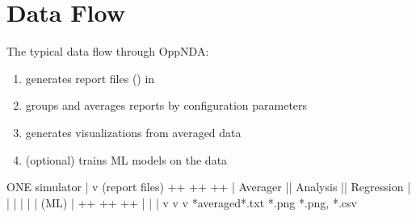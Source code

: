 \documentclass[a4paper,11pt,english,openany,oneside]{sphinxmanual}
\begin{document}
\section{Data Flow}
\label{\detokenize{developer_guide:data-flow}}
\sphinxAtStartPar
The typical data flow through OppNDA:
\begin{enumerate}
%
\item {} 
\sphinxAtStartPar
{} generates report files () in 

\item {} 
\sphinxAtStartPar
{} groups and averages reports by configuration parameters

\item {} 
\sphinxAtStartPar
{} generates visualizations from averaged data

\item {} 
\sphinxAtStartPar
{} (optional) trains ML models on the data

\end{enumerate}

\begin{sphinxVerbatim}[commandchars=\\\{\}]
ONE simulator
     |
     v (report files)
+\PYGZhy{}\PYGZhy{}\PYGZhy{}\PYGZhy{}\PYGZhy{}\PYGZhy{}\PYGZhy{}\PYGZhy{}\PYGZhy{}\PYGZhy{}\PYGZhy{}\PYGZhy{}\PYGZhy{}+     +\PYGZhy{}\PYGZhy{}\PYGZhy{}\PYGZhy{}\PYGZhy{}\PYGZhy{}\PYGZhy{}\PYGZhy{}\PYGZhy{}\PYGZhy{}\PYGZhy{}\PYGZhy{}\PYGZhy{}+     +\PYGZhy{}\PYGZhy{}\PYGZhy{}\PYGZhy{}\PYGZhy{}\PYGZhy{}\PYGZhy{}\PYGZhy{}\PYGZhy{}\PYGZhy{}\PYGZhy{}\PYGZhy{}\PYGZhy{}+
|  Averager   |\PYGZhy{}\PYGZhy{}\PYGZhy{}\PYGZhy{}\PYGZgt{}|  Analysis   |\PYGZhy{}\PYGZhy{}\PYGZhy{}\PYGZhy{}\PYGZgt{}|  Regression |
|             |     |             |     |   (ML)      |
+\PYGZhy{}\PYGZhy{}\PYGZhy{}\PYGZhy{}\PYGZhy{}\PYGZhy{}\PYGZhy{}\PYGZhy{}\PYGZhy{}\PYGZhy{}\PYGZhy{}\PYGZhy{}\PYGZhy{}+     +\PYGZhy{}\PYGZhy{}\PYGZhy{}\PYGZhy{}\PYGZhy{}\PYGZhy{}\PYGZhy{}\PYGZhy{}\PYGZhy{}\PYGZhy{}\PYGZhy{}\PYGZhy{}\PYGZhy{}+     +\PYGZhy{}\PYGZhy{}\PYGZhy{}\PYGZhy{}\PYGZhy{}\PYGZhy{}\PYGZhy{}\PYGZhy{}\PYGZhy{}\PYGZhy{}\PYGZhy{}\PYGZhy{}\PYGZhy{}+
     |                    |                   |
     v                    v                   v
*\PYGZus{}averaged\PYGZus{}*.txt         *.png           *.png, *.csv
\end{sphinxVerbatim}
\end{document}
